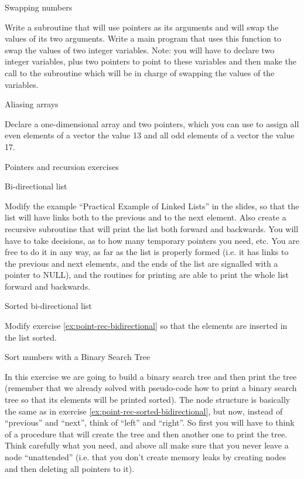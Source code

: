  {Swapping numbers}
\label{ex:pointer-swap}

Write a subroutine that will use pointers as its arguments and will swap the
values of its two arguments. Write a main program that uses this function to
swap the values of two integer variables. Note: you will have to declare two
integer variables, plus two pointers to point to these variables and then make
the call to the subroutine which will be in charge of swapping the values of the
variables.


 {Aliasing arrays}
\label{ex:pointer-alias-arrays}

Declare a one-dimensional array and two pointers, which you can use to assign
all even elements of a vector the value 13 and all odd elements of a vector the
value 17.  



 {Pointers and recursion exercises}
\label{sec:pointers-recursion-exercises}

 {Bi-directional list}
\label{ex:point-rec-bidirectional}

Modify the example ``Practical Example of Linked Lists'' in the slides, so that
the list will have links both to the previous and to the next element. Also
create a recursive subroutine that will print the list both forward and
backwards. You will have to take decisions, as to how many temporary pointers
you need, etc. You are free to do it in any way, as far as the list is properly
formed (i.e. it has links to the previous and next elements, and the ends of the
list are signalled with a pointer to NULL), and the routines for printing are
able to print the whole list forward and backwards.

 {Sorted bi-directional list}
\label{ex:point-rec-sorted-bidirectional}

Modify exercise \ref{ex:point-rec-bidirectional} so that the elements are
inserted in the list sorted.

 {Sort numbers with a Binary Search Tree}
\label{ex:point-rec-bst}

In this exercise we are going to build a binary search tree and then print the
tree (remember that we already solved with pseudo-code how to print a binary
search tree so that its elements will be printed sorted). The node structure is
basically the same as in exercise \ref{ex:point-rec-sorted-bidirectional}, but
now, instead of ``previous'' and ``next'', think of ``left'' and ``right''. So
first you will have to think of a procedure that will create the tree and then
another one to print the tree. Think carefully what you need, and above all make
sure that you never leave a node ``unattended'' (i.e. that you don't create
memory leaks by creating nodes and then deleting all pointers to it).

